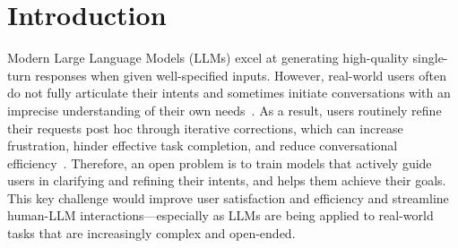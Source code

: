 
\section{Introduction}

Modern Large Language Models (LLMs) excel at generating high-quality single-turn responses when given well-specified inputs. 
However, real-world users often do not fully articulate their intents and sometimes 
initiate conversations with an imprecise understanding of their own needs~\cite{taylor:1968}.
%
As a result,
users routinely refine their requests post hoc through iterative corrections, which can 
increase frustration, hinder effective task completion, and reduce conversational efficiency~\cite{guidelines, johnny,understand_user_experience}. Therefore, an open problem is to train models that actively guide users in clarifying and refining their intents, and helps them achieve their goals.
This key challenge would improve user satisfaction and efficiency
and streamline human-LLM interactions---especially as LLMs are being applied to real-world tasks that are increasingly complex and open-ended.

